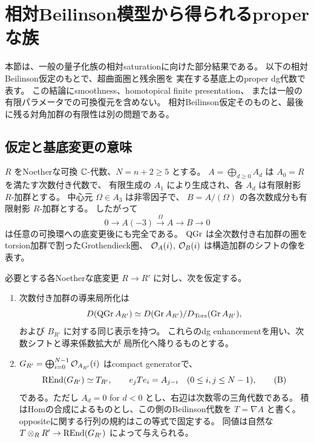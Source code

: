 \section{相対Beilinson模型から得られるproperな族}
\label{sec:relative-proper-model}

本節は、一般の量子化族の相対saturationに向けた部分結果である。
以下の相対Beilinson仮定のもとで、超曲面圏と残余圏を
実在する基底上のproper dg代数で表す。
この結論にsmoothness、homotopical finite presentation、
または一般の有限パラメータでの可換復元を含めない。
相対Beilinson仮定そのものと、最後に残る対角加群の有限性は別の問題である。

\subsection{仮定と基底変更の意味}

\(R\) をNoetherな可換 \(\mathbb C\)-代数、\(N=n+2\ge5\) とする。
\(A=\bigoplus_{d\ge0}A_d\) は \(A_0=R\) を満たす次数付き代数で、
有限生成の \(A_1\) により生成され、各 \(A_d\) は有限射影 \(R\)-加群とする。
中心元 \(\Omega\in A_3\) は非零因子で、
\(B=A/(\Omega)\) の各次数成分も有限射影 \(R\)-加群とする。
したがって
\[
 0\longrightarrow A(-3)\xrightarrow{\Omega}A
   \longrightarrow B\longrightarrow0
 \tag{Q}\label{eq:relative-quotient-sequence}
\]
は任意の可換環への底変更後にも完全である。
\(\operatorname{QGr}\) は全次数付き右加群の圏をtorsion加群で割ったGrothendieck圏、
\(\mathcal O_A(i)\), \(\mathcal O_B(i)\) は構造加群のシフトの像を表す。

\begin{definition}[本節の相対Beilinson仮定]\label{def:relative-beilinson-hyp}
 必要とする各Noetherな底変更 \(R\to R'\) に対し、次を仮定する。
 \begin{enumerate}[label=(RB\arabic*)]
 \item 次数付き加群の導来局所化は
 \[
 D(\operatorname{QGr} A_{R'})\simeq
 D(\operatorname{Gr}A_{R'})/
 D_{\operatorname{Tors}}(\operatorname{Gr}A_{R'}),
 \]
 および \(B_{R'}\) に対する同じ表示を持つ。
 これらのdg enhancementを用い、次数シフトと導来係数拡大が
 局所化へ降りるものとする。
 \item \(G_{R'}=\bigoplus_{i=0}^{N-1}\mathcal O_{A_{R'}}(i)\) はcompact generatorで、
 \[
 \operatorname{REnd}(G_{R'})\simeq T_{R'},\qquad
 e_jTe_i=A_{j-i}\quad(0\le i,j\le N-1),
 \tag{B}\label{eq:relative-beilinson-algebra}
 \]
 である。ただし \(A_d=0\) for \(d<0\) とし、右辺は次数零の三角代数である。
 積はHomの合成によるものとし、この側のBeilinson代数を \(T=\nabla A\) と書く。
 oppositeに関する行列の規約はこの等式で固定する。
 同値は自然な \(T\otimes_RR'\to\operatorname{REnd}(G_{R'})\) によって与えられる。
 \end{enumerate}
\end{definition}


